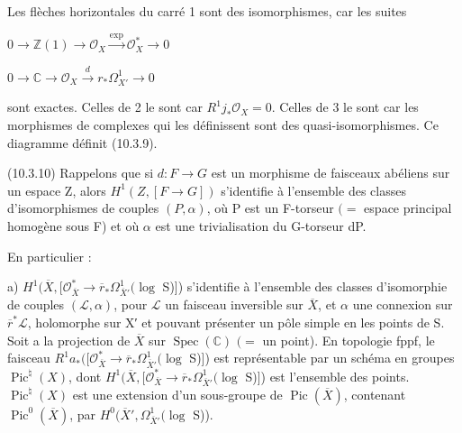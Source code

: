 \documentclass[11pt,twoside]{article}
\newcommand{\DFormula}[1]{%
  \par\smallskip\noindent\hspace*{0pt}\(\displaystyle #1\)\par\smallskip
}
\begin{document}
Les flèches horizontales du carré 1 sont des isomorphismes, car les suites\par
\par\medskip
\DFormula{0\to \mathbb{Z}(1)\to \mathcal{O}_{X}\xrightarrow{\operatorname{exp}}\mathcal{O}_{X}^{\ast }\to 0}
\par\medskip
\DFormula{0\to \mathbb{C}\to \mathcal{O}_{X}\xrightarrow{d}r_{\ast }\Omega ^{1}_{X′}\to 0}
\par\medskip
sont exactes. Celles de 2 le sont car \(R^{1}j_{\ast }\mathcal{O}_{X}=0\). Celles de 3 le sont car les morphismes de complexes qui les définissent sont des quasi-isomorphismes. Ce diagramme définit (10.3.9).\par
\par\medskip
(10.3.10) Rappelons que si \(d:F\to G\) est un morphisme de faisceaux abéliens sur un espace Z, alors \(H^{1}(Z,[F\to G])\) s’identifie à l’ensemble des classes d’isomorphismes de couples \((P,\alpha )\), où P est un F-torseur \((=\) espace principal homogène sous F) et où \(\alpha \) est une trivialisation du G-torseur dP.\par
\par\medskip
En particulier :\par
\par\medskip
a) \(H^{1}(\overline{X},[\mathcal{O}_{\overline{X}}^{\ast }\to \overline{r}_{\ast }\Omega ^{1}_{\overline{X}′}(\operatorname{log}\) S)]) s’identifie à l’ensemble des classes d’isomorphie de couples \((\mathcal{L},\alpha )\), pour \(\mathcal{L}\) un faisceau inversible sur \(\overline{X}\), et \(\alpha \) une connexion sur \(\overline{r}^{\ast }\mathcal{L}\), holomorphe sur X′ et pouvant présenter un pôle simple en les points de S. Soit a la projection de \(\overline{X}\) sur \(\operatorname{Spec}(\mathbb{C})\) \((=\) un point). En topologie fppf, le faisceau \(R^{1}a_{\ast }([\mathcal{O}_{\overline{X}}^{\ast }\to \overline{r}_{\ast }\Omega ^{1}_{\overline{X}′}(\operatorname{log}\) S)]) est représentable par un schéma en groupes \(\operatorname{Pic}^{\natural }(X)\), dont \(H^{1}(\overline{X},[\mathcal{O}_{\overline{X}}^{\ast }\to \overline{r}_{\ast }\Omega ^{1}_{\overline{X}′}(\operatorname{log}\) S)]) est l’ensemble des points. \(\operatorname{Pic}^{\natural }(X)\) est une extension d’un sous-groupe de \(\operatorname{Pic}(\overline{X})\), contenant \(\operatorname{Pic}^{0}(\overline{X})\), par \(H^{0}(\overline{X}′,\Omega ^{1}_{\overline{X}′}(\operatorname{log}\) S)).\par
\par\medskip
\end{document}
